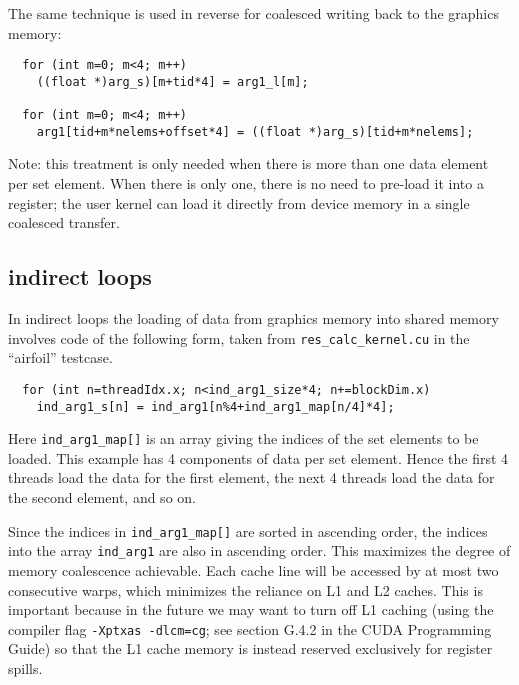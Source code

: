 \documentclass[12pt]{article}
\begin{document}
The same technique is used in reverse for coalesced writing back to the
graphics memory:
\begin{verbatim}
  for (int m=0; m<4; m++)                                                       
    ((float *)arg_s)[m+tid*4] = arg1_l[m];                                      
                                                                                
  for (int m=0; m<4; m++)                                                       
    arg1[tid+m*nelems+offset*4] = ((float *)arg_s)[tid+m*nelems];               
\end{verbatim}

Note: this treatment is only needed when there is more than one data element
per set element.  When there is only one, there is no need to pre-load it into 
a register; the user kernel can load it directly from device memory in a
single coalesced transfer.

\newpage
\subsection{indirect loops}

In indirect loops the loading of data from graphics memory into shared 
memory involves code of the following form, taken from 
{\tt res\_calc\_kernel.cu} in the ``airfoil'' testcase.
\begin{verbatim}
  for (int n=threadIdx.x; n<ind_arg1_size*4; n+=blockDim.x)                       
    ind_arg1_s[n] = ind_arg1[n%4+ind_arg1_map[n/4]*4];                            
\end{verbatim}                                                                                  
Here \verb!ind_arg1_map[]! is an array giving the indices of the set 
elements to be loaded.  This example has 4 components of data per set 
element.  Hence the first 4 threads load the data for the first element, 
the next 4 threads load the data for the second element, and so on.

Since the indices in \verb!ind_arg1_map[]! are sorted in ascending order,
the indices into the array \verb!ind_arg1! are also in ascending order.
This maximizes the degree of memory coalescence achievable. Each cache line
will be accessed by at most two consecutive warps, which minimizes the 
reliance on L1 and L2 caches. This is important because in the future we
may want to turn off L1 caching (using the compiler flag {\tt -Xptxas -dlcm=cg}; 
see section G.4.2 in the CUDA Programming Guide) so that the L1 cache 
memory is instead reserved exclusively for register spills.
\end{document}
